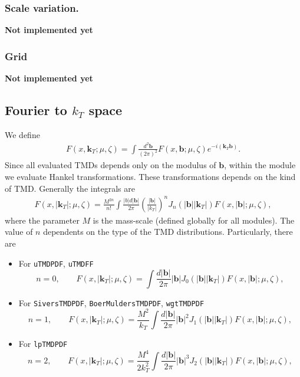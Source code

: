 \documentclass[prd,nofootinbib,eqsecnum,final]{revtex4}
\renewcommand{\(}{\left(}
\renewcommand{\)}{\right)}
\renewcommand{\[}{\left[}
\renewcommand{\]}{\right]}
\renewcommand{\vec}[1]{\bm{#1}}
\begin{document}
\subsubsection{Scale variation.} 

\textbf{Not implemented yet}

\subsubsection{Grid}
\label{sec:OPEtw3:grid1}

\textbf{Not implemented yet}

\subsection{Fourier to $k_T$ space}
\label{sec:Fourier_to_kt}

We define
\begin{eqnarray}
F(x,\vec k_T;\mu,\zeta)=\int \frac{d^2\vec b}{(2\pi)^2}F(x,\vec b;\mu,\zeta)e^{-i(\vec k_T \vec b)}.
\end{eqnarray}
Since all evaluated TMDs depends only on the modulus of $\vec b$, within the module we evaluate Hankel transformations. These transformations depends on the kind of TMD. Generally the integrals are
\begin{eqnarray}\label{kT-J0}
F(x,|\vec k_T|;\mu,\zeta)=\frac{M^{2n}}{n!}\int \frac{|b|d|\vec b|}{2\pi} \(\frac{|\vec  b|}{|k_T|}\)^{n} J_n(|\vec b||\vec k_T|) F(x,|\vec b|;\mu,\zeta),
\end{eqnarray}
where the parameter $M$ is the mass-scale (defined globally for all modules). The value of $n$ dependents on the type of the TMD distributions. Particularly, there are
\begin{itemize}
\item For \texttt{uTMDPDF}, \texttt{uTMDFF}
$$
n=0,\qquad F(x,|\vec k_T|;\mu,\zeta)=\int \frac{d|\vec b|}{2\pi}|\vec  b| J_0(|\vec b||\vec k_T|) F(x,|\vec b|;\mu,\zeta),
$$

\item For \texttt{SiversTMDPDF}, \texttt{BoerMuldersTMDPDF}, \texttt{wgtTMDPDF}
$$
n=1,\qquad F(x,|\vec k_T|;\mu,\zeta)=\frac{M^2}{k_T}\int \frac{d|\vec b|}{2\pi}|\vec  b|^2 J_1(|\vec b||\vec k_T|) F(x,|\vec b|;\mu,\zeta),
$$

\item For \texttt{lpTMDPDF}
$$
n=2,\qquad F(x,|\vec k_T|;\mu,\zeta)=\frac{M^4}{2k_T^2}\int \frac{d|\vec b|}{2\pi}|\vec  b|^3 J_2(|\vec b||\vec k_T|) F(x,|\vec b|;\mu,\zeta),
$$
\end{itemize}
\end{document}
